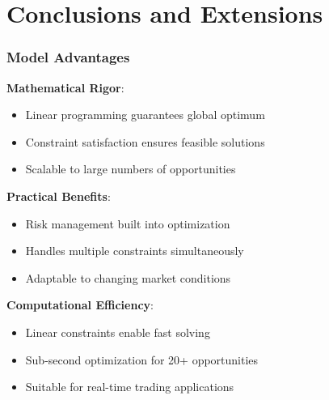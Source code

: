 \documentclass{beamer}
\begin{document}
\section{Conclusions and Extensions}

\begin{frame}
\frametitle{Model Advantages}
\textbf{Mathematical Rigor}:
\begin{itemize}
    \item Linear programming guarantees global optimum
    \item Constraint satisfaction ensures feasible solutions
    \item Scalable to large numbers of opportunities
\end{itemize}

\vspace{0.5cm}

\textbf{Practical Benefits}:
\begin{itemize}
    \item Risk management built into optimization
    \item Handles multiple constraints simultaneously
    \item Adaptable to changing market conditions
\end{itemize}

\vspace{0.5cm}

\textbf{Computational Efficiency}:
\begin{itemize}
    \item Linear constraints enable fast solving
    \item Sub-second optimization for 20+ opportunities
    \item Suitable for real-time trading applications
\end{itemize}
\end{frame}
\end{document}
